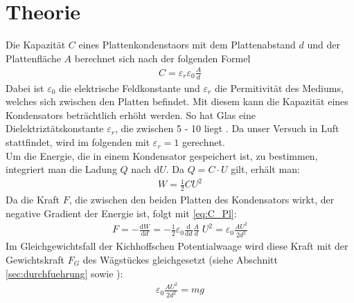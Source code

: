 \documentclass[12pt,a4paper,titlepage,headinclude,bibtotoc]{scrartcl}
\newcommand{\dif}{\ensuremath{\mathrm{d}}}
\begin{document}
\section{Theorie}
\label{sec:theorie}
Die Kapazität $C$ eines Plattenkondenstaors mit dem Plattenabstand $d$ und der Plattenfläche $A$ berechnet sich nach der folgenden Formel \cite[S.335]{gerthsen}
\begin{align}
 C=\varepsilon_r\varepsilon_0\frac{A}{d}
 \label{eq:C_Pl}
\end{align}
Dabei ist $\varepsilon_0$ die elektrische Feldkonstante und $\varepsilon_r$ die Permitivität des Mediums, welches sich zwischen den Platten befindet.
Mit diesem kann die Kapazität eines Kondensators beträchtlich erhöht werden.
So hat Glas eine Dielektriztätskonstante $\varepsilon_r$, die zwischen 5 - 10 liegt \cite[S.335]{gerthsen}.
Da unser Versuch in Luft stattfindet, wird im folgenden mit $\varepsilon_r=1$ gerechnet.\\
Um die Energie, die in einem Kondensator gespeichert ist, zu bestimmen, integriert man die Ladung $Q$ nach $\dif U$.
Da $Q=C\cdot U$ gilt, erhält man:
\begin{align}
 W=\frac{1}{2} C U^2
\end{align}
Da die Kraft $F$, die zwischen den beiden Platten des Kondensators wirkt, der negative Gradient der Energie ist, folgt mit \eqref{eq:C_Pl}:
\begin{align}
 F=-\frac{\dif W}{\dif d}= -\frac{1}{2}\varepsilon_0\frac{\dif}{\dif d}\frac{A}{d} \;U^2 =\varepsilon_0\frac{A U^2}{2 d^2}
 \label{eq:F_Pl}
\end{align}
Im Gleichgewichtsfall der Kichhoffschen Potentialwaage wird diese Kraft mit der Gewichtskraft $F_G$ des Wägstückes gleichgesetzt (siehe Abschnitt \ref{sec:durchfuehrung} sowie \cite[S.329 f.]{gerthsen}):
\begin{align}
 \varepsilon_0\frac{A U^2}{2 d^2}=mg
 \label{eq:PotWaage}
\end{align}
\end{document}
